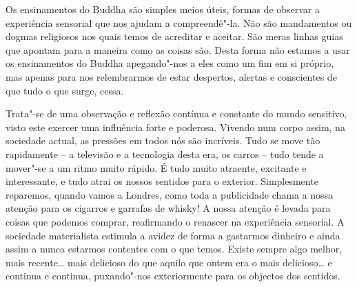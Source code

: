 Os ensinamentos do Buddha são simples meios úteis, formas de observar a
experiência sensorial que nos ajudam a compreendê"-la. Não são
mandamentos ou dogmas religiosos nos quais temos de acreditar e aceitar.
São meras linhas guias que apontam para a maneira como as coisas são.
Desta forma não estamos a usar os ensinamentos do Buddha apegando"-nos a
eles como um fim em si próprio, mas apenas para nos relembrarmos de
estar despertos, alertas e conscientes de que tudo o que surge, cessa.

Trata"-se de uma observação e reflexão contínua e constante do mundo
sensitivo, visto este exercer uma influência forte e poderosa. Vivendo
num corpo assim, na sociedade actual, as pressões em todos nós são
incríveis. Tudo se move tão rapidamente -- a televisão e a tecnologia
desta era, os carros -- tudo tende a mover"-se a um ritmo muito rápido. É
tudo muito atraente, excitante e interessante, e tudo atrai os nossos
sentidos para o exterior. Simplesmente reparemos, quando vamos a
Londres, como toda a publicidade chama a nossa atenção para os cigarros
e garrafas de whisky! A nossa atenção é levada para coisas que podemos
comprar, reafirmando o renascer na experiência sensorial. A sociedade
materialista estimula a avidez de forma a gastarmos dinheiro e ainda
assim a nunca estarmos contentes com o que temos. Existe sempre algo
melhor, mais recente\ldots{} mais delicioso do que aquilo que ontem era
o mais delicioso\ldots{} e continua e continua, puxando"-nos
exteriormente para os objectos dos sentidos.

